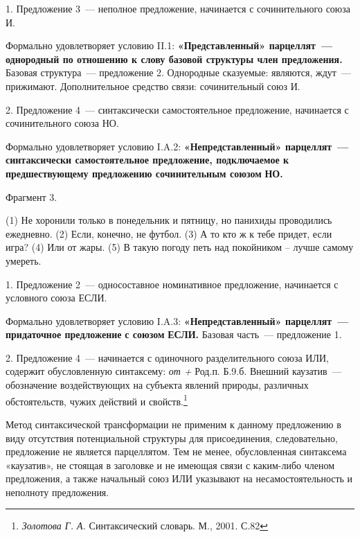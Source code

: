 \documentclass{kursa4}
\begin{document}
    \textcolor[rgb]{0.2,0.2,0.2}{1. Предложение 3~--- неполное
    предложение, начинается с сочинительного союза И.}

    \textcolor[rgb]{0.2,0.2,0.2}{Формально удовлетворяет условию II.1:
    }\textbf{\textcolor[rgb]{0.2,0.2,0.2}{«Представленный» парцеллят~---
    однородный по отношению к слову базовой структуры член предложения.
    }}\textcolor[rgb]{0.2,0.2,0.2}{Базовая структура~--- предложение 2.
    Однородные сказуемые: являются, ждут~--- прижимают. Дополнительное
    средство связи: сочинительный союз И.}

    \textcolor[rgb]{0.2,0.2,0.2}{2. Предложение 4~--- синтаксически
    самостоятельное предложение, начинается с сочинительного союза НО.}


    \bigskip

    \textcolor[rgb]{0.2,0.2,0.2}{Формально удовлетворяет условию I.A.2:
    }\textbf{\textcolor[rgb]{0.2,0.2,0.2}{«Непредставленный»
    п}}\textbf{{арцеллят~--- синтаксически самостоятельное
    предложение, подключаемое к предшествующему предложению сочинительным
    союз}}\textbf{{ом}}\textbf{\textit{{
    }}}\textbf{{НО.}}


    \bigskip

    {Фрагмент 3.}

    {(1) Не хоронили только в понедельник и пятницу, но
    панихиды проводились ежедневно. (2) Если, конечно, не футбол. (3) А то
    кто ж к тебе придет, если игра? (4) Или от жары. (5)
    }\textcolor[rgb]{0.2,0.2,0.2}{В такую погоду петь над покойником –
    лучше самому умереть.}

    {1. Предложение 2~--- односоставное номинативное
    предложение, начинается с условного союза ЕСЛИ.}

    {Формально удовлетворяет условию I.A.3:
    }\textbf{{«Непредставленный» парцеллят~--- придаточное
    предложение }}\textbf{{с союзом
    }}\textbf{{ЕСЛИ}}\textbf{{.
    }}{Базовая часть~--- предложение 1. }

    {2. Предложение 4~--- начинается с одиночного
    разделительного союза ИЛИ, содержит обусловленную синтаксему:
    }\textit{{от + }}{Род.п. Б.9.б.
    Внешний каузатив~--- обозначение воздействующих на субъекта явлений
    природы, различных обстоятельств, чужих действий и
    свойств.}\footnote{\textit{{ Золотова Г. А.
    }}{Синтаксический словарь. М., 2001.
    С.82}}{ }

    {Метод синтаксической трансформации не применим к
    данному предложению в виду отсутствия потенциальной структуры для
    присоединения, следовательно, предложение не является парцеллятом. Тем
    не менее, обусловленная синтаксема «каузатив», не стоящая в заголовке и
    не имеющая связи с каким-либо членом предложения, а также начальный
    союз ИЛИ указывают на несамостоятельность и неполноту предложения. }
\end{document}

